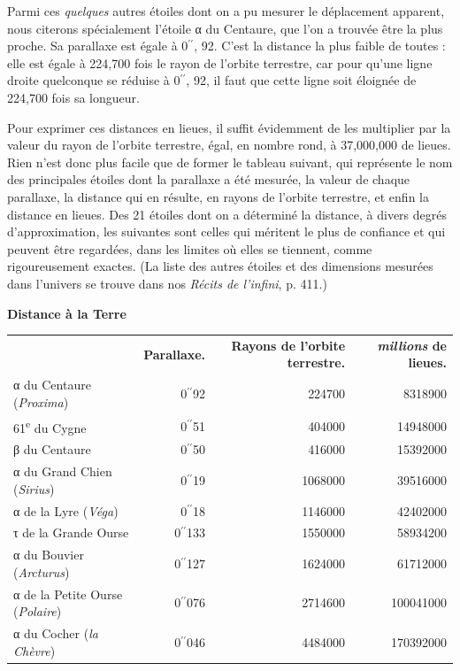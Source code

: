 \documentclass[a4paper, 11pt, oneside, landscape]{article}
\begin{document}
Parmi ces \emph{quelques} autres étoiles dont on a pu mesurer le déplacement apparent, nous citerons spécialement l'étoile α du Centaure, que l'on a trouvée être la plus proche. Sa parallaxe est égale à 0$^{\prime\prime}$, 92. C'est la distance la plus faible de toutes : elle est égale à 224,700 fois le rayon de l'orbite terrestre, car pour qu'une ligne droite quelconque se réduise à 0$^{\prime\prime}$, 92, il faut que cette ligne soit éloignée de 224,700 fois sa longueur.

Pour exprimer ces distances en lieues, il suffit évidemment de les multiplier par la valeur du rayon de l'orbite terrestre, égal, en nombre rond, à 37,000,000 de lieues. Rien n'est donc plus facile que de former le tableau suivant, qui représente le nom des principales étoiles dont la parallaxe a été mesurée, la valeur de chaque parallaxe, la distance qui en résulte, en rayons de l'orbite terrestre, et enfin la distance en lieues. Des 21 étoiles dont on a déterminé la distance, à divers degrés d'approximation, les suivantes sont celles qui méritent le plus de confiance et qui peuvent être regardées, dans les limites où elles se tiennent, comme rigoureusement exactes. (La liste des autres étoiles et des dimensions mesurées dans l'univers se trouve dans nos \emph{Récits de l'infini}, p. 411.)
\begin{center}
\textbf{Distance à la Terre}
\end{center}
\begin{table}[H]
    \centering
    \bfseries
    \begin{tabular}{l r r r}
        ~ & \textbf{Parallaxe.} & \textbf{Rayons de l'orbite terrestre.} & \textbf{\emph{millions} de lieues.} \\
        α du Centaure (\emph{Proxima}) & 0$^{\prime\prime}$92 & 224700 & 8318900 \\
        61\textsuperscript{e} du Cygne & 0$^{\prime\prime}$51 & 404000 & 14948000 \\
        β du Centaure & 0$^{\prime\prime}$50 & 416000 & 15392000 \\
        α du Grand Chien (\emph{Sirius}) & 0$^{\prime\prime}$19 & 1068000 & 39516000 \\
        α de la Lyre (\emph{Véga}) & 0$^{\prime\prime}$18 & 1146000 & 42402000 \\
        τ de la Grande Ourse & 0$^{\prime\prime}$133 & 1550000 & 58934200 \\
        α du Bouvier (\emph{Arcturus}) & 0$^{\prime\prime}$127 & 1624000 & 61712000 \\
        α de la Petite Ourse (\emph{Polaire}) & 0$^{\prime\prime}$076 & 2714600 & 100041000 \\
        α du Cocher (\emph{la Chèvre}) & 0$^{\prime\prime}$046 & 4484000 & 170392000 \\
    \end{tabular}
\end{table}
\clearpage
\end{document}
